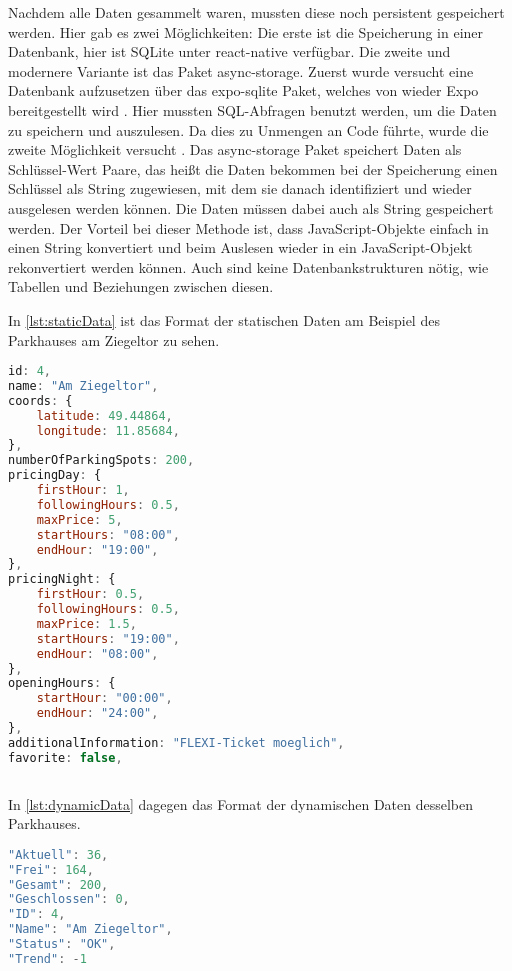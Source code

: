 Nachdem alle Daten gesammelt waren, mussten diese noch persistent gespeichert werden. Hier gab es zwei Möglichkeiten: Die erste ist die Speicherung in einer Datenbank, hier ist SQLite unter react-native verfügbar. Die zweite und modernere Variante ist das Paket async-storage. Zuerst wurde versucht eine Datenbank aufzusetzen über das expo-sqlite Paket, welches von wieder Expo bereitgestellt wird \cite{expo-sqlite}. Hier mussten SQL-Abfragen benutzt werden, um die Daten zu speichern und auszulesen. Da dies zu Unmengen an Code führte, wurde die zweite Möglichkeit versucht \cite{async-storage}. Das async-storage Paket speichert Daten als Schlüssel-Wert Paare, das heißt die Daten bekommen bei der Speicherung einen Schlüssel als String zugewiesen, mit dem sie danach identifiziert und wieder ausgelesen werden können. Die Daten müssen dabei auch als String gespeichert werden. Der Vorteil bei dieser Methode ist, dass JavaScript-Objekte einfach in einen String konvertiert und beim Auslesen wieder in ein JavaScript-Objekt rekonvertiert werden können. Auch sind keine Datenbankstrukturen nötig, wie Tabellen und Beziehungen zwischen diesen.

In \autoref{lst:staticData} ist das Format der statischen Daten am Beispiel des Parkhauses am Ziegeltor zu sehen.

  \begin{lstlisting}[language=JavaScript, caption={Format der statischen Daten der Parkhäuser am Beispiel des Parkhauses am Ziegeltor}, label=lst:staticData]
id: 4,
name: "Am Ziegeltor",
coords: {
	latitude: 49.44864,
	longitude: 11.85684,
},
numberOfParkingSpots: 200,
pricingDay: {
	firstHour: 1,
	followingHours: 0.5,
	maxPrice: 5,
	startHours: "08:00",
	endHour: "19:00",
},
pricingNight: {
	firstHour: 0.5,
	followingHours: 0.5,
	maxPrice: 1.5,
	startHours: "19:00",
	endHour: "08:00",
},
openingHours: {
	startHour: "00:00",
	endHour: "24:00",
},
additionalInformation: "FLEXI-Ticket moeglich",
favorite: false,
	
\end{lstlisting}

In \autoref{lst:dynamicData} dagegen das Format der dynamischen Daten desselben Parkhauses.

  \begin{lstlisting}[language=JavaScript, caption={Format der dynamischen Daten der Parkhäuser am Beispiel des Parkhauses am Ziegeltor}, label=lst:dynamicData]
"Aktuell": 36,
"Frei": 164,
"Gesamt": 200,
"Geschlossen": 0,
"ID": 4,
"Name": "Am Ziegeltor",
"Status": "OK",
"Trend": -1
	
\end{lstlisting}

